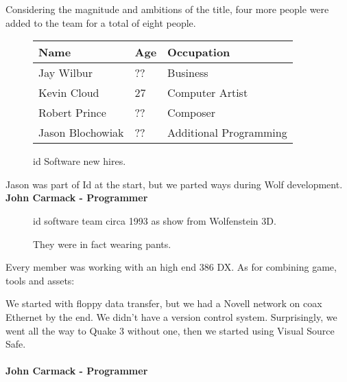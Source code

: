 \documentclass[book.tex]{subfiles}
\begin{document}
Considering the magnitude and ambitions of the title, four more people were added to the team for a total of eight people.\\

 \begin{figure}[H]
\centering  
\begin{tabularx}{\textwidth}{ X  X  X  }
  \toprule
  \textbf{Name} &  \textbf{Age} & \textbf{Occupation} \\
  \toprule 
   Jay Wilbur & ?? &  Business\\
   Kevin Cloud & 27 &  Computer Artist\\
   Robert Prince & ?? &  Composer\\
   Jason Blochowiak & ?? &  Additional Programming\\
     \toprule
\end{tabularx}
\caption{id Software new hires.}\label{fig:Id Software hires}
\end{figure}

\begin{fancyquotes}
Jason was part of Id at the start, but we parted ways during Wolf development.
 \bigskip \\
\textbf{John Carmack - Programmer}
 \end{fancyquotes}
 
\begin{figure}[H]
\centering
\caption{id software team circa 1993 as show from Wolfenstein 3D.}
\label{fig:id_team_1993}
\end{figure}

\begin{figure}[H]
\centering
\caption{They were in fact wearing pants.}
\label{fig:id_team_1993}
\end{figure}

Every member was working with an high end 386 DX. As for combining game, tools and assets:\\

 \begin{fancyquotes}
We started with floppy data transfer, but we had a Novell network on coax Ethernet by the end. We didn't have a version control system.  Surprisingly, we went all the way to Quake 3 without one, then we started using Visual Source Safe.\\
 \\
\textbf{John Carmack - Programmer}
\end{fancyquotes}
\end{document}
